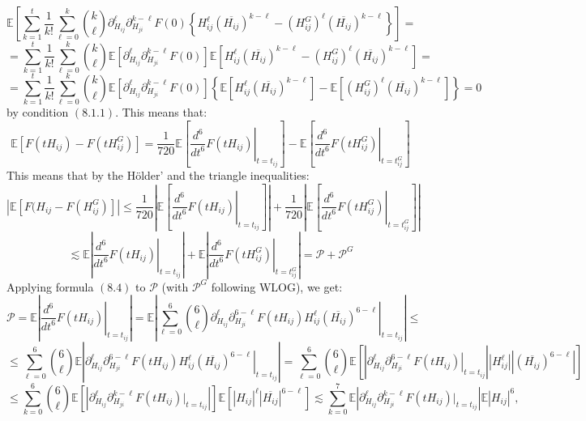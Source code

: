 \documentclass[11pt]{article}
\begin{document}
$$\mathbb{E}\left[\sum_{k=1}^t\frac{1}{k!}\sum_{\ell=0}^k \binom{k}{\ell}\partial_{H_{ij}}^\ell \partial_{H_{ji}}^{k-\ell} F(0) \left\{H_{ij}^\ell \left(\overline{H_{ij}}\right)^{k-\ell}-(H_{ij}^G)^\ell \left(\overline{H_{ij}}\right)^{k-\ell}\right\}\right]=$$
$$=\sum_{k=1}^t\frac{1}{k!}\sum_{\ell=0}^k \binom{k}{\ell}\mathbb{E}\left[\partial_{H_{ij}}^\ell \partial_{H_{ji}}^{k-\ell} F(0) \right]\mathbb{E}\left[H_{ij}^\ell \left(\overline{H_{ij}}\right)^{k-\ell}-(H_{ij}^G)^\ell \left(\overline{H_{ij}}\right)^{k-\ell}\right]=$$
$$=\sum_{k=1}^t\frac{1}{k!}\sum_{\ell=0}^k \binom{k}{\ell}\mathbb{E}\left[\partial_{H_{ij}}^\ell \partial_{H_{ji}}^{k-\ell} F(0) \right]\left\{\mathbb{E}\left[H_{ij}^\ell \left(\overline{H_{ij}}\right)^{k-\ell}\right]-\mathbb{E}\left[(H_{ij}^G)^\ell \left(\overline{H_{ij}}\right)^{k-\ell}\right]\right\}=0$$
by condition $(8.1.1)$. This means that:
$$\mathbb{E}\left[F(tH_{ij})-F(tH_{ij}^G)\right]=\frac{1}{720} \mathbb{E}\left[\left.\frac{d^6}{dt^6}F(tH_{ij})\right\vert_{t=t_{ij}}\right]-\mathbb{E}\left[\left.\frac{d^6}{dt^6}F(tH_{ij}^G)\right\vert_{t=t_{ij}^G}\right]$$
This means that by the Hölder' and the triangle inequalities: 
$$\left\vert \mathbb{E}\left[ F(H_{ij} - F(H_{ij}^G)\right] \right\vert\leq \frac{1}{720} \left\vert\mathbb{E}\left[\left.\frac{d^6}{dt^6}F(tH_{ij})\right\vert_{t=t_{ij}}\right]\right\vert+\frac{1}{720}\left\vert\mathbb{E}\left[\left.\frac{d^6}{dt^6}F(tH_{ij}^G)\right\vert_{t=t_{ij}^G}\right]\right\vert $$
$$\lesssim \mathbb{E}\left\vert\left.\frac{d^6}{dt^6}F(tH_{ij})\right\vert_{t=t_{ij}}\right\vert+\mathbb{E}\left\vert\left.\frac{d^6}{dt^6}F(tH_{ij}^G)\right\vert_{t=t_{ij}^G}\right\vert = \mathcal{P} + \mathcal{P}^G$$
Applying formula $(8.4)$ to $\mathcal{P}$ (with $\mathcal{P}^G$ following WLOG), we get:
$$\mathcal{P} = \mathbb{E}\left\vert\left.\frac{d^6}{dt^6}F(tH_{ij})\right\vert_{t=t_{ij}}\right\vert  = \mathbb{E}\left\vert  \left.\sum_{\ell=0}^6 \binom{6}{\ell}\partial_{H_{ij}}^\ell \partial_{H_{ji}}^{6-\ell} F(tH_{ij})H_{ij}^\ell \left(\overline{H_{ij}}\right)^{6-\ell}\right\vert_{t=t_{ij}}\right\vert\leq $$
$$\leq \sum_{\ell=0}^6 \binom{6}{\ell}\mathbb{E}\left\vert \left.
\partial_{H_{ij}}^\ell \partial_{H_{ji}}^{6-\ell} F(tH_{ij})H_{ij}^\ell \left(\overline{H_{ij}}\right)^{6-\ell}\right\vert_{t=t_{ij}}
\right\vert = \sum_{\ell=0}^6 \binom{6}{\ell}\mathbb{E}\left[\left\vert \left.
\partial_{H_{ij}}^\ell \partial_{H_{ji}}^{6-\ell} F(tH_{ij})\right\vert _{t=t_{ij}}\right\vert
\left\vert H_{ij}^\ell \right\vert \left\vert \left(\overline{H_{ij}}\right)^{6-\ell}
\right\vert \right]$$
$$\leq \sum_{k=0}^6\binom{6}{\ell} \mathbb{E}\left[ \left\vert \partial_{H_{ij}}^\ell \partial_{H_{ji}}^{k-\ell} F(tH_{ij})|_{t=t_{ij}}\right\vert\right] \mathbb{E}\left[|H_{ij}|^\ell \left\vert \overline{H_{ij}}\right\vert^{6-\ell}\right]\lesssim \sum_{k=0}^7 \mathbb{E}\left\vert \partial_{H_{ij}}^\ell \partial_{H_{ji}}^{k-\ell} F(tH_{ij})|_{t=t_{ij}}\right\vert\mathbb{E}|H_{ij}|^6,$$
\end{document}
